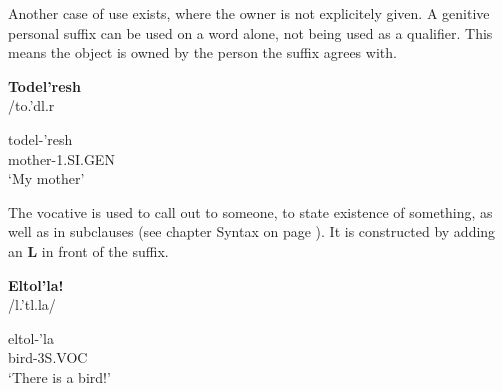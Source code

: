 Another case of use exists, where the owner is not explicitely given. A genitive personal suffix can
be used on a word alone, not being used as a qualifier. This means the object is owned by the person
the suffix agrees with.

\begin{exe}
\ex\label{exe:person-gen-1obj}
\textbf{Todel’resh}\\
/to.'d{\ipaE}l.r{\ipaE\ipaS}

\gll \gls{todel}-’resh\\
mother-1.SI.GEN\\
\trans ‘My mother’
\end{exe}

The vocative is used to call out to someone, to state existence of something, as well as in subclauses (see chapter Syntax on page \pageref{chap:syntax}).
It is constructed by adding an \textbf{L} in front of the suffix.

\begin{exe}
\ex\label{ex:person-voc-1}
\textbf{Eltol’la!}\\
/{\ipaE}l.'t{\ipaO}l.la/

\gll eltol-’la\\
bird-3S.VOC\\
\trans ‘There is a bird!’
\end{exe}

